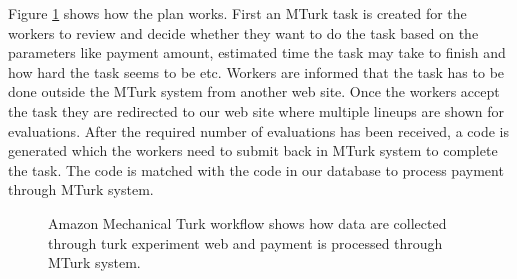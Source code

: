 \documentclass[11pt]{article}
\begin{document}
Figure \ref{fig:turk_work_flow} shows how the plan works. First an MTurk task is created for the workers to review and decide whether they want to do the task based on the parameters like payment amount, estimated time the task may take to finish and how hard the task seems to be etc. Workers are informed that the task has to be done outside the MTurk system from another web site. Once the workers accept the task they are redirected to our web site where multiple lineups are shown for evaluations. After the required number of evaluations has been received, a code is generated which the workers need to submit back in MTurk system to complete the task. The code is matched with the code in our database to process payment through MTurk system.

\begin{figure}[htbp]
   \centering
       \caption{Amazon Mechanical Turk workflow shows how data are collected through turk experiment web and payment is processed through MTurk system.}
       \label{fig:turk_work_flow}
\end{figure}
\end{document}
